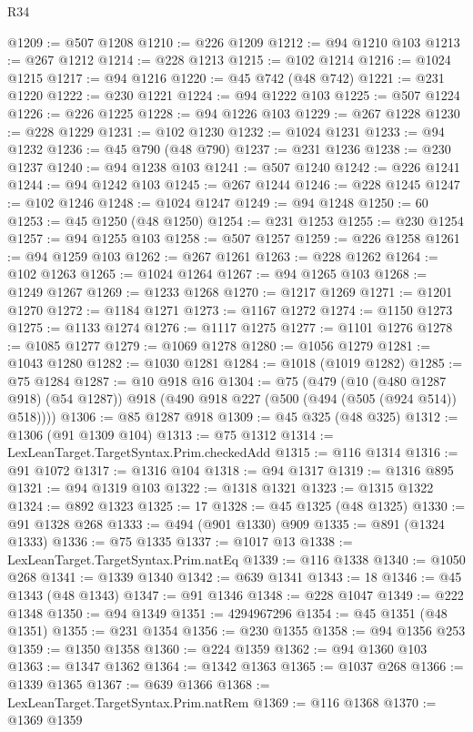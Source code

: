 \begin{lexlean}{R34}
\begin{coremodule}
@1209 := @507 @1208
@1210 := @226 @1209
@1212 := @94 @1210 @103
@1213 := @267 @1212
@1214 := @228 @1213
@1215 := @102 @1214
@1216 := @1024 @1215
@1217 := @94 @1216
@1220 := @45 @742 (@48 @742)
@1221 := @231 @1220
@1222 := @230 @1221
@1224 := @94 @1222 @103
@1225 := @507 @1224
@1226 := @226 @1225
@1228 := @94 @1226 @103
@1229 := @267 @1228
@1230 := @228 @1229
@1231 := @102 @1230
@1232 := @1024 @1231
@1233 := @94 @1232
@1236 := @45 @790 (@48 @790)
@1237 := @231 @1236
@1238 := @230 @1237
@1240 := @94 @1238 @103
@1241 := @507 @1240
@1242 := @226 @1241
@1244 := @94 @1242 @103
@1245 := @267 @1244
@1246 := @228 @1245
@1247 := @102 @1246
@1248 := @1024 @1247
@1249 := @94 @1248
@1250 := 60
@1253 := @45 @1250 (@48 @1250)
@1254 := @231 @1253
@1255 := @230 @1254
@1257 := @94 @1255 @103
@1258 := @507 @1257
@1259 := @226 @1258
@1261 := @94 @1259 @103
@1262 := @267 @1261
@1263 := @228 @1262
@1264 := @102 @1263
@1265 := @1024 @1264
@1267 := @94 @1265 @103
@1268 := @1249 @1267
@1269 := @1233 @1268
@1270 := @1217 @1269
@1271 := @1201 @1270
@1272 := @1184 @1271
@1273 := @1167 @1272
@1274 := @1150 @1273
@1275 := @1133 @1274
@1276 := @1117 @1275
@1277 := @1101 @1276
@1278 := @1085 @1277
@1279 := @1069 @1278
@1280 := @1056 @1279
@1281 := @1043 @1280
@1282 := @1030 @1281
@1284 := @1018 (@1019 @1282)
@1285 := @75 @1284
@1287 := @10 @918 @16
@1304 := @75
    (@479
      (@10 (@480 @1287 @918) (@54 @1287))
      @918
      (@490 @918 @227 (@500 (@494 (@505 (@924 @514)) @518))))
@1306 := @85 @1287 @918
@1309 := @45 @325 (@48 @325)
@1312 := @1306 (@91 @1309 @104)
@1313 := @75 @1312
@1314 := LexLeanTarget.TargetSyntax.Prim.checkedAdd
@1315 := @116 @1314
@1316 := @91 @1072
@1317 := @1316 @104
@1318 := @94 @1317
@1319 := @1316 @895
@1321 := @94 @1319 @103
@1322 := @1318 @1321
@1323 := @1315 @1322
@1324 := @892 @1323
@1325 := 17
@1328 := @45 @1325 (@48 @1325)
@1330 := @91 @1328 @268
@1333 := @494 (@901 @1330) @909
@1335 := @891 (@1324 @1333)
@1336 := @75 @1335
@1337 := @1017 @13
@1338 := LexLeanTarget.TargetSyntax.Prim.natEq
@1339 := @116 @1338
@1340 := @1050 @268
@1341 := @1339 @1340
@1342 := @639 @1341
@1343 := 18
@1346 := @45 @1343 (@48 @1343)
@1347 := @91 @1346
@1348 := @228 @1047
@1349 := @222 @1348
@1350 := @94 @1349
@1351 := 4294967296
@1354 := @45 @1351 (@48 @1351)
@1355 := @231 @1354
@1356 := @230 @1355
@1358 := @94 @1356 @253
@1359 := @1350 @1358
@1360 := @224 @1359
@1362 := @94 @1360 @103
@1363 := @1347 @1362
@1364 := @1342 @1363
@1365 := @1037 @268
@1366 := @1339 @1365
@1367 := @639 @1366
@1368 := LexLeanTarget.TargetSyntax.Prim.natRem
@1369 := @116 @1368
@1370 := @1369 @1359

\end{coremodule}
\end{lexlean}
